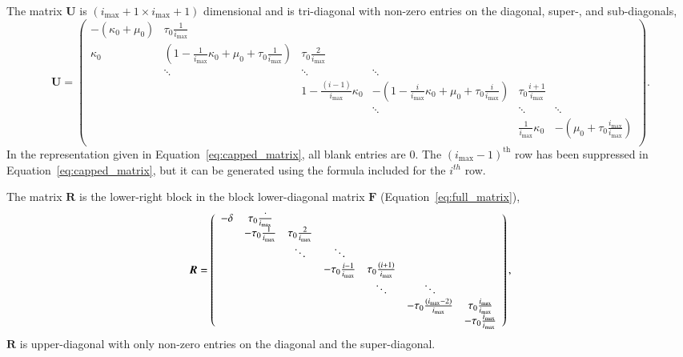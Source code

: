 \documentclass[review]{elsarticle}
\newcommand{\imax}{\ensuremath{i_{\max}}\xspace}
\let\bs\boldsymbol
\begin{document}
The matrix $\bs{U}$ is $(\imax+1\times \imax+1)$ dimensional and is tri-diagonal with non-zero entries on the diagonal, super-, and sub-diagonals,
\begin{equation}
\label{eq:capped_matrix}
\bs{U}=\left(\begin{array}{cccccc}
-(\kappa_0+\mu_0) & \tau_0\frac{1}{\imax} &  &  &  & \\
\kappa_0 & \left(1-\frac{1}{\imax} \kappa_0+\mu_0+\tau_0\frac{1}{\imax}\right) & \tau_0\frac{2}{\imax} &  &  & \\
   &\ddots        & \ddots        & \ddots & &  \\
   & &    1-\frac{(i-1)}{\imax}\kappa_0 & -\left(1-\frac{i}{\imax}\kappa_0+\mu_0+\tau_0\frac{i}{\imax}\right) & \tau_0\frac{i+1}{\imax} & \\
                  &         &        & \ddots  & \ddots & \ddots \\
     
                          &        &  &  & \frac{1}{\imax}\kappa_0 & -\left(\mu_0+\tau_0\frac{\imax}{\imax}\right) \\
\end{array}\right).
\end{equation}
In the representation given in Equation~\ref{eq:capped_matrix}, all blank entries are 0.
The $(\imax-1)^{\text{th}}$ row has been suppressed in Equation~\ref{eq:capped_matrix}, but it can be generated using the formula included for the $i^{th}$ row.

The matrix $\bs{R}$ is the lower-right block in the block lower-diagonal matrix $\bs{F}$ (Equation~\ref{eq:full_matrix}),
\begin{equation}
\label{eq:decapped_matrix}
\bs{R}=\left(
\begin{array}{ccccccc}
-\delta & \tau_0\frac{`}{\imax} & & & & & \\
 & -\tau_0\frac{1}{\imax} & \tau_0\frac{2}{\imax} & & & &\\
 & & \ddots & \ddots & & & \\
 & & & -\tau_0\frac{i-1}{\imax} & \tau_0\frac{(i+1)}{\imax} & & \\
 & & & & \ddots & \ddots & \\
 & & & & & -\tau_0\frac{(\imax-2)}{\imax} & \tau_0\frac{\imax}{\imax} \\
 & & & & & & -\tau_0\frac{\imax}{\imax} \\
\end{array}
\right),
\end{equation}
$\bs{R}$ is upper-diagonal with only non-zero entries on the diagonal and the super-diagonal.
\end{document}
